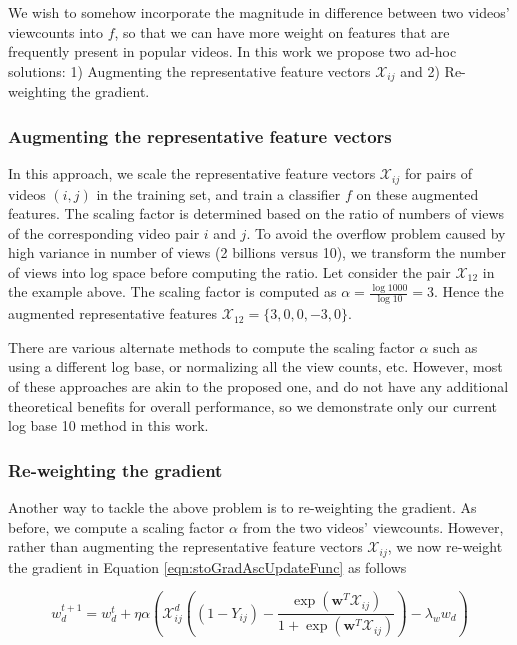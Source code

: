 	We wish to somehow incorporate the magnitude in difference between two videos' viewcounts into $f$, so that we can have more weight on features that are frequently present in popular videos. In this work we propose two ad-hoc solutions: 1) Augmenting the representative feature vectors $\mathcal{X}_{ij}$ and 2) Re-weighting the gradient.

	\subsubsection{Augmenting the representative feature vectors}
		In this approach, we scale the representative feature vectors $\mathcal{X}_{ij}$ for pairs of videos $(i, j)$ in the training set, and train a classifier $f$ on these augmented features. The scaling factor is determined based on the ratio of numbers of views of the corresponding video pair $i$ and $j$. To avoid the overflow problem caused by high variance in number of views (2 billions versus 10), we transform the number of views into log space before computing the ratio. Let consider the pair $\mathcal{X}_{12}$ in the example above. The scaling factor is computed as $\alpha = \frac{\log 1000}{\log 10} = 3$. Hence the augmented representative features $\mathcal{X}_{12} = \{3, 0, 0, -3, 0\}$. 

		There are various alternate methods to compute the scaling factor $\alpha$ such as using a different log base, or normalizing all the view counts, etc. However, most of these approaches are akin to the proposed one, and do not have any additional theoretical benefits for overall performance, so we demonstrate only our current log base 10 method in this work.

	\subsubsection{Re-weighting the gradient}
		Another way to tackle the above problem is to re-weighting the gradient. As before, we compute a scaling factor $\alpha$ from the two videos' viewcounts.  However, rather than augmenting the representative feature vectors $\mathcal{X}_{ij}$, we now re-weight the gradient in Equation \ref{eqn:stoGradAscUpdateFunc} as follows

		\begin{equation}
		w^{t+1}_d = w^t_d + \eta \alpha (\mathcal{X}_{ij}^d ( (1 - Y_{ij}) - \frac{\exp(\textbf{w}^T\mathcal{X}_{ij})}{1 + \exp(\textbf{w}^T\mathcal{X}_{ij})})  - \lambda_w w_d)
		\label{eqn:stoGradAscUpdateFuncGeneric}
		\end{equation}

